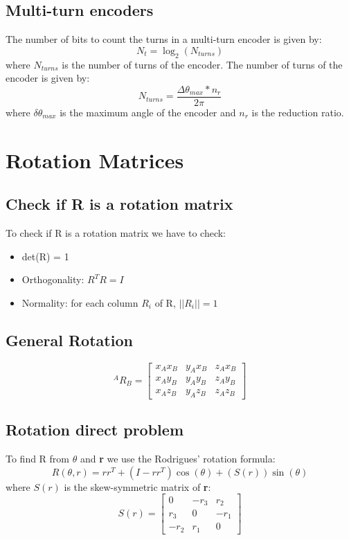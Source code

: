 \documentclass[11pt]{article}
\begin{document}
\subsection{Multi-turn encoders}
The number of bits to count the turns in a multi-turn encoder is given by:
\begin{equation}
  N_t = \log_2(N_{turns})
\end{equation}
where $N_{turns}$ is the number of turns of the encoder.
The number of turns of the encoder is given by:
\begin{equation}
  N_{turns} = \frac{\Delta\theta_{max}*n_r}{2\pi}
\end{equation}
where $\delta\theta_{max}$ is the maximum angle of the encoder and $n_r$ is the reduction ratio.
\section{Rotation Matrices}\label{sec:rotation}
\subsection{Check if R is a rotation matrix}\label{sec:check_rotation}
To check if R is a rotation matrix we have to check:
\begin{itemize}
  \item det(R) = 1
  \item Orthogonality: $R^TR = I$
  \item Normality: for each column $R_i$ of R, $||R_i|| = 1$
\end{itemize}
\subsection{General Rotation}
\begin{equation}
  ^{A}R_B = \begin{bmatrix}
    x_A  x_B & y_A x_B & z_A x_B \\
    x_A  y_B & y_A y_B & z_A y_B \\
    x_A  z_B & y_A z_B & z_A z_B
  \end{bmatrix}
\end{equation}

\subsection{Rotation direct problem}
To find R from $\theta$ and \textbf{r} we use the Rodrigues' rotation formula:
\begin{equation}
  R(\theta, r)= rr^T+ (I-rr^T)\cos(\theta) + (S(r))\sin(\theta)
\end{equation}
where $S(r)$ is the skew-symmetric matrix of \textbf{r}:
\begin{equation}
  S(r) = \begin{bmatrix}
    0    & -r_3 & r_2  \\
    r_3  & 0    & -r_1 \\
    -r_2 & r_1  & 0
  \end{bmatrix}
\end{equation}
\end{document}
